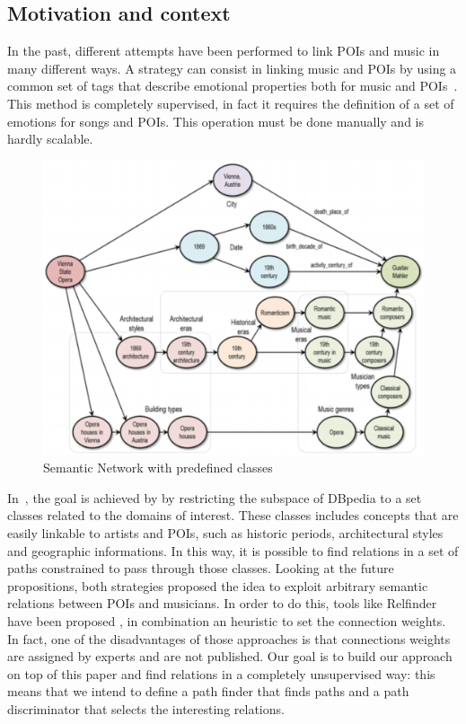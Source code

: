\documentclass[paper=a4, fontsize=11pt]{scrartcl}
\begin{document}
\subsection{Motivation and context}
In the past, different attempts have been performed to link POIs and music in many different ways. A strategy can consist in linking music and POIs by using a common set of tags that describe emotional properties both for music and POIs~\cite{Kaminskas:2013:LMR:2507157.2507180}. This method is completely supervised, in fact it requires the definition of a set of emotions for songs and POIs. This operation must be done manually and is hardly scalable.
\begin{figure}[!htb]
  \centering 
    \includegraphics[width=1\textwidth]{images/semantic_net.png}
    \caption{Semantic Network with predefined classes}
\end{figure}

In~\cite{Kaminskas:2012:KMR:2390848.2390854}, the goal is achieved by by restricting the subspace of DBpedia to a set classes related to the domains of interest. These classes includes concepts that are easily linkable to artists and POIs, such as historic periods, architectural styles and geographic informations. In this way, it is possible to find relations in a set of paths constrained to pass through those classes.
Looking at the future propositions, both strategies proposed the idea to exploit arbitrary semantic relations between POIs and musicians.
In order to do this, tools like Relfinder have been proposed \cite{Heim:2009:RRR:1695324.1695351}, in combination an heuristic to set the connection weights. In fact, one of the disadvantages of those approaches is that connections weights are assigned by experts and are not published.
Our goal is to build our approach on top of this paper and find relations in a completely unsupervised way: this means that we intend to define a path finder that finds paths and a path discriminator that selects the interesting relations.
\end{document}
